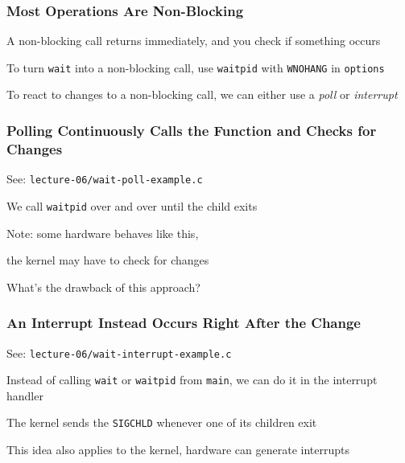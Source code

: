   \begin{frame}
    \frametitle{Most Operations Are Non-Blocking}

    A non-blocking call returns immediately, and you check if something occurs

    \vspace{2em}

    To turn \texttt{wait} into a non-blocking call, use \texttt{waitpid} with
    \texttt{WNOHANG} in \texttt{options}

    \vspace{2em}

    To react to changes to a non-blocking call, we can either use a
    \textit{poll} or \textit{interrupt}
  \end{frame}

  \begin{frame}
    \frametitle{Polling Continuously Calls the Function and Checks for Changes}

    See: \texttt{lecture-06/wait-poll-example.c}

    \vspace{2em}

    We call \texttt{waitpid} over and over until the child exits

    \hspace{2em} Note: some hardware behaves like this,
    
    \hspace{5em} the kernel may have to check for changes

    \vspace{2em}

    What's the drawback of this approach?

  \end{frame}

  \begin{frame}
    \frametitle{An Interrupt Instead Occurs Right After the Change}

    See: \texttt{lecture-06/wait-interrupt-example.c}

    \vspace{2em}

    Instead of calling \texttt{wait} or \texttt{waitpid} from \texttt{main},
    we can do it in the interrupt handler

    \hspace{2em} The kernel sends the \texttt{SIGCHLD} whenever one of its
                 children exit

    \vspace{2em}

    This idea also applies to the kernel, hardware can generate interrupts
  \end{frame}

